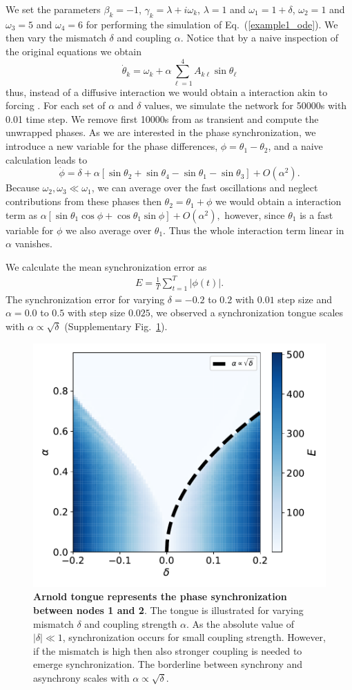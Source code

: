 \documentclass[12pt]{article}
\theoremstyle{plain}
\theoremstyle{definition}
\theoremstyle{remark}
\theoremstyle{remark}
\begin{document}
We set the parameters $\beta_k = -1$, $\gamma_k = \lambda + i \omega_k$, $\lambda = 1 $ and $\omega_1 = 1+ \delta$, $\omega_2 = 1$ and $\omega_3 = 5$ and $\omega_4 = 6$ for performing the simulation of Eq.~(\ref{example1_ode}). We then vary the mismatch $\delta$ and coupling $\alpha$. Notice that by a naive inspection of the original equations we obtain 
$$
\dot \theta_k = \omega_k + \alpha \sum_{\ell=1}^4 
A_{k \ell} \sin \theta_{\ell} 
$$
thus, instead of a diffusive interaction we would obtain a interaction akin to forcing \cite{Eroglu_2017_sync_chaos}. For each set of $\alpha$ and $\delta$ values, we simulate the network for  50000s with 0.01 time step. We remove first 10000s from  as transient and compute the unwrapped phases. As we are interested in the phase synchronization, we introduce a new variable for the phase differences, $\phi = \theta_1-\theta_2$, and a naive calculation leads to  
$$
\dot \phi = \delta + \alpha[ \sin \theta_2 + \sin \theta_4 - \sin \theta_1 - \sin \theta_3]  + O(\alpha^2). 
$$
Because $\omega_2,\omega_3 \ll \omega_1$, we can average over the fast oscillations and neglect contributions from these phases then  $\theta_2 = \theta_1 + \phi$ we would obtain a interaction term as 
$
\alpha [\sin \theta_1 \cos \phi + \cos \theta_1 \sin \phi] + O(\alpha^2),
$
however, since $\theta_1$ is a fast variable for $\phi$ we also average over $\theta_1$. Thus the whole interaction term linear in $\alpha$ vanishes.  

We calculate the mean synchronization error as
\begin{align}\label{reconstructed_md}
E = \frac{1}{T} \sum_{t=1}^T |\phi(t)|.
\end{align}
The synchronization error for varying $\delta = -0.2$ to $0.2$ with $0.01$ step size and $\alpha = 0.0$ to $0.5$ with step size $0.025$, we observed a synchronization tongue scales with $\alpha \propto \sqrt{\delta}$ (Supplementary Fig.~\ref{fig:sync_tongue}).

\begin{figure}[h]
    \centering
    \includegraphics[width=0.5\columnwidth]{sync_tongue_v2.pdf}
    \caption{{\bf Arnold tongue represents the phase synchronization between nodes 1 and 2}. The tongue is illustrated for varying mismatch $\delta$ and coupling strength $\alpha$. As the absolute value of $|\delta| \ll 1$, synchronization occurs for small coupling strength. However, if the mismatch is high then also stronger coupling is needed to emerge synchronization. The borderline between synchrony and asynchrony scales with $\alpha \propto \sqrt{\delta}$.}
    \label{fig:sync_tongue}
\end{figure}
\end{document}
